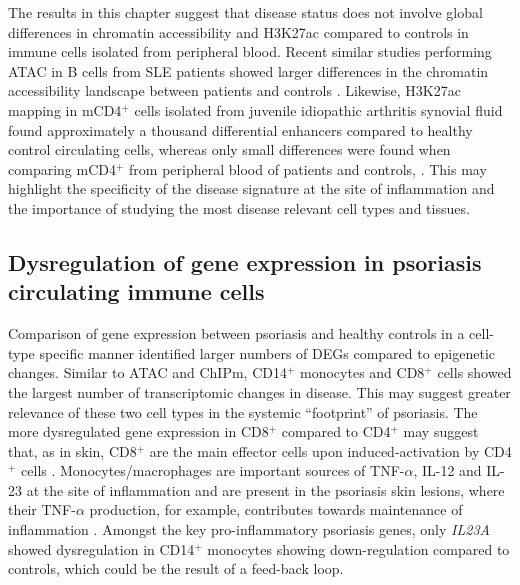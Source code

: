 The results in this chapter suggest that disease status does not involve global differences in chromatin accessibility and H3K27ac compared to controls in immune cells isolated from peripheral blood. Recent similar studies performing ATAC in B cells from SLE patients showed larger differences in the chromatin accessibility landscape between patients and controls \parencite{Scharer2016}. Likewise, H3K27ac mapping in mCD4$^+$ cells isolated from juvenile idiopathic arthritis synovial fluid found approximately a thousand differential enhancers compared to healthy control circulating cells, whereas only small differences were found when comparing mCD4$^+$ from peripheral blood of patients and controls, \parencite{Peeters2015}. This may highlight the specificity of the disease signature at the site of inflammation and the importance of studying the most disease relevant cell types and tissues.




\subsection{Dysregulation of gene expression in psoriasis circulating immune cells}

Comparison of gene expression between psoriasis and healthy controls in a cell-type specific manner identified larger numbers of DEGs compared to epigenetic changes. Similar to ATAC and ChIPm, CD14$^+$ monocytes and CD8$^+$ cells showed the largest number of transcriptomic changes in disease. This may suggest greater relevance of these two cell types in the systemic “footprint” of psoriasis. The more dysregulated gene expression in CD8$^+$ compared to CD4$^+$ may suggest that, as in skin, CD8$^+$ are the main effector cells upon induced-activation by CD4$^+$ cells \parencite{Nickoloff1999}. Monocytes/macrophages are important sources of TNF-$\alpha$, IL-12 and IL-23 at the site of inflammation and are present in the  psoriasis skin lesions, where their TNF-$\alpha$ production, for example, contributes towards maintenance of inflammation \parencite{Parameswaran2010,Nickoloff2007,Wang2006}. Amongst the key pro-inflammatory psoriasis genes, only \textit{IL23A} showed dysregulation in CD14$^+$ monocytes showing down-regulation compared to controls, which could be the result of a feed-back loop.

